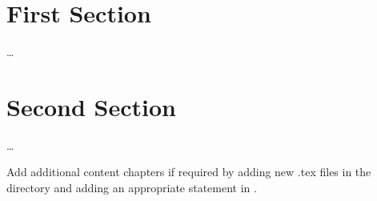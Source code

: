 \section{First Section}
\label{sec:SecondContent:FirstSection}

\dots

\section{Second Section}
\label{sec:SecondContent:SecondSection}

\dots

Add additional content chapters if required by adding new .tex files in the
 directory and adding an appropriate 
 statement in . 
